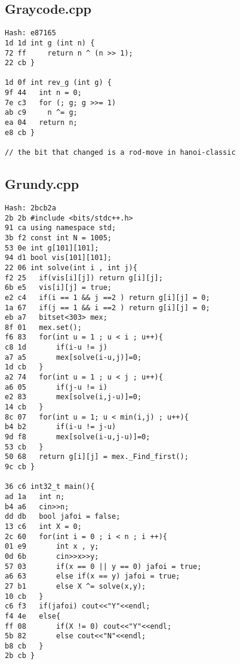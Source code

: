 \documentclass[11pt, a4paper, twoside]{article}
\begin{document}
\subsection{Graycode.cpp}
\begin{lstlisting}
Hash: e87165
1d 1d int g (int n) {
72 ff     return n ^ (n >> 1);
22 cb }

1d 0f int rev_g (int g) {
9f 44   int n = 0;
7e c3   for (; g; g >>= 1)
ab c9     n ^= g;
ea 04   return n;
e8 cb }

// the bit that changed is a rod-move in hanoi-classic
\end{lstlisting}

\subsection{Grundy.cpp}
\begin{lstlisting}
Hash: 2bcb2a
2b 2b #include <bits/stdc++.h>
91 ca using namespace std;
3b f2 const int N = 1005;
53 0e int g[101][101];
94 d1 bool vis[101][101];
22 06 int solve(int i , int j){
f2 25 	if(vis[i][j]) return g[i][j];
6b e5 	vis[i][j] = true;
e2 c4 	if(i == 1 && j ==2 ) return g[i][j] = 0;
1a 67 	if(j == 1 && i ==2 ) return g[i][j] = 0; 
eb a7 	bitset<303> mex;
8f 01 	mex.set();
f6 83 	for(int u = 1 ; u < i ; u++){
c8 1d 		if(i-u != j)
a7 a5 		mex[solve(i-u,j)]=0;
1d cb 	}
a2 74 	for(int u = 1 ; u < j ; u++){
a6 05 		if(j-u != i)
e2 83 		mex[solve(i,j-u)]=0;
14 cb 	}
8c 07 	for(int u = 1; u < min(i,j) ; u++){
b4 b2 		if(i-u != j-u)
9d f8 		mex[solve(i-u,j-u)]=0;
53 cb 	}
50 68 	return g[i][j] = mex._Find_first();
9c cb }
 
36 c6 int32_t main(){
ad 1a 	int n;
b4 a6 	cin>>n;
dd db 	bool jafoi = false;
13 c6 	int X = 0;
2c 60 	for(int i = 0 ; i < n ; i ++){
01 e9 		int x , y;
0d 6b 		cin>>x>>y;
57 03 		if(x == 0 || y == 0) jafoi = true;
a6 63 		else if(x == y) jafoi = true;
27 b1 		else X ^= solve(x,y);
10 cb 	}
c6 f3 	if(jafoi) cout<<"Y"<<endl;
f4 4e 	else{
ff 08 		if(X != 0) cout<<"Y"<<endl;
5b 82 		else cout<<"N"<<endl;
b8 cb 	}
2b cb }
\end{lstlisting}
\end{document}

